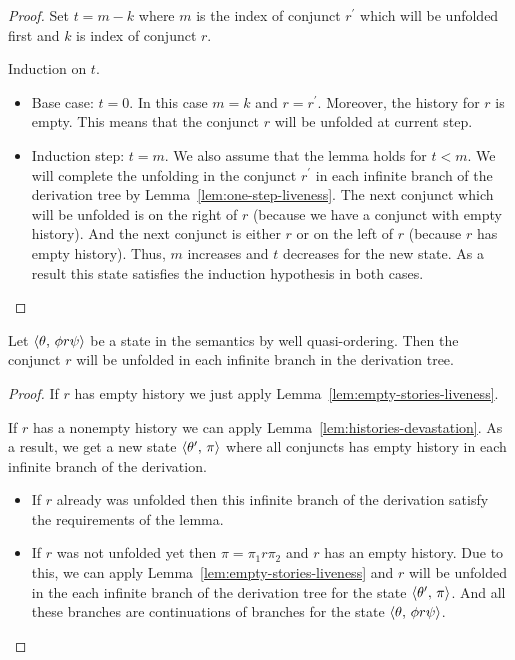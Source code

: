 \begin{proof}
 Set $t = m - k$ where $m$ is the index of conjunct $r^\prime$ which will be unfolded first and $k$ is index of conjunct $r$.

Induction on $t$.

\begin{itemize}
    \item Base case: $t = 0$. In this case $m = k$ and $r = r^\prime$. Moreover, the history for $r$ is empty. This means that the conjunct $r$ will
    be unfolded at current step.
    \item Induction step: $t = m$. We also assume that the lemma holds for $t < m$.
    We will complete the unfolding in the conjunct $r^\prime$ in each infinite branch of the derivation tree by Lemma~\ref{lem:one-step-liveness}.
    The next conjunct which will be unfolded is on the right of $r$ (because we have a conjunct with empty history). And the next conjunct is either $r$ or
    on the left of $r$ (because $r$ has empty history). Thus, $m$ increases and $t$ decreases for the new state. As a result this state satisfies
    the induction hypothesis in both cases.
\end{itemize}
\end{proof}

\begin{lemma}
  \label{lem:liveness}
Let $\langle \theta,\, \phi r \psi \rangle$ be a state in the semantics by well quasi-ordering. Then the conjunct $r$ will be unfolded in each infinite branch in the derivation tree.
\end{lemma}
\begin{proof}
If $r$ has empty history we just apply Lemma~\ref{lem:empty-stories-liveness}.

If $r$ has a nonempty history we can apply Lemma~\ref{lem:histories-devastation}. As a result, we get a new state $\langle \theta^\prime,\, \pi \rangle$ where all conjuncts
has empty history in each infinite branch of the derivation.

\begin{itemize}
    \item If $r$ already was unfolded then this infinite branch of the derivation satisfy the requirements of the lemma.
    \item If $r$ was not unfolded yet then $\pi = \pi_1 r \pi_2$ and $r$ has an empty history. Due to this, we can apply 
    Lemma~\ref{lem:empty-stories-liveness} and $r$ will be unfolded in the each infinite branch of the derivation tree for the state $\langle \theta^\prime,\, \pi \rangle$.
    And all these branches are continuations of branches for the state $\langle \theta,\, \phi r \psi \rangle$.
\end{itemize}
\end{proof}

